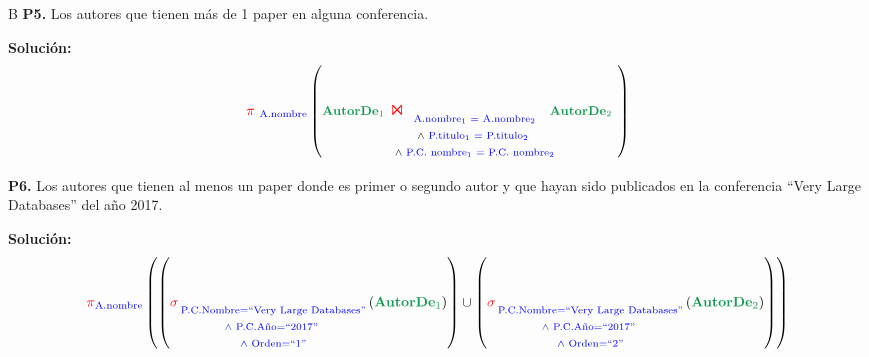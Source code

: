 \documentclass[letterpaper,11pt]{article}
\begin{document}
B
\textbf{P5.} Los autores que tienen más de 1 paper en alguna conferencia.

\textbf{Solución:}
{\large
\begin{equation*}
 \textcolor{red}{\pi}_{\textcolor{blue}{\ \textrm{A.nombre}}} \left(\textbf{\small \textcolor{ForestGreen}{AutorDe$_1$}}\ {\textcolor{red}{\textup{\Large $\Join$}}}_{\textrm{
$\begin{array}{@{\hspace{-10pt}}c@{\hspace{-10pt}}}
 \textrm{\textcolor{blue}{A.nombre$_1$ = A.nombre$_2$}}\\
 \wedge\ \textrm{\textcolor{blue}{P.titulo$_1$ = P.titulo$_2$} } \\
 \wedge\ \textrm{\textcolor{blue}{ P.C. nombre$_1$ = P.C. nombre$_2$}}
 \end{array}$
 }}\ \textbf{\textcolor{ForestGreen}{\small AutorDe$_2$} }  \right)
\end{equation*}
}

\newpage
\textbf{P6.} Los autores que tienen al menos un paper donde es primer o segundo autor y que hayan sido publicados en la conferencia “Very Large Databases” del año 2017.

\textbf{Solución:}
{\large
\begin{equation*}
 \textcolor{red}{\pi}_{\textcolor{blue}{\textrm{A.nombre}}} \left(\left(\textcolor{red}{\sigma}_{\textcolor{blue}{\textrm{
   $\begin{array}{@{\hspace{-1pt}}c@{\hspace{-1pt}}}
   \textrm{\textcolor{blue}{P.C.Nombre=``Very Large Databases''}}\\
   \wedge\ \textrm{\textcolor{blue}{P.C.Año=``2017''} } \\
   \wedge\ \textrm{\textcolor{blue}{ Orden=``1''}}
   \end{array}$
   }}} (\textbf{\textcolor{ForestGreen}{AutorDe$_1$}})\right) \cup \left(\textcolor{red}{\sigma}_{\textcolor{blue}{\textrm{
 $\begin{array}{@{\hspace{-1pt}}c@{\hspace{-1pt}}}
 \textrm{\textcolor{blue}{P.C.Nombre=``Very Large Databases''}}\\
 \wedge\ \textrm{\textcolor{blue}{P.C.Año=``2017''} } \\
 \wedge\ \textrm{\textcolor{blue}{ Orden=``2''}}
 \end{array}$
 }}}(\textbf{\textcolor{ForestGreen}{AutorDe$_2$}})\right)\right)
\end{equation*}
}
\end{document}
